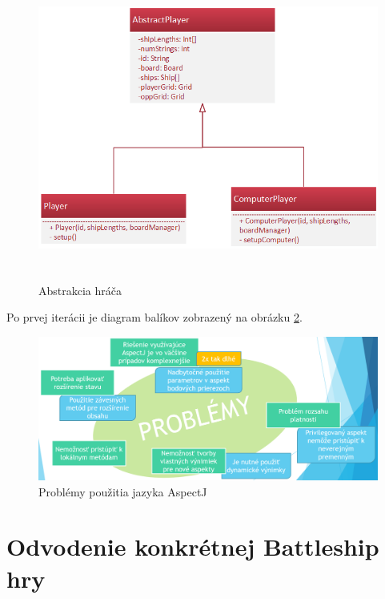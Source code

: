 \documentclass[11pt,slovak,a4paper,twoside]{article}
\begin{document}
\begin{figure}[H]  %
					\begin{center}
									\includegraphics[height=10cm]{fig/playerAbstraction.png}
									\caption{Abstrakcia hráča}
									\label{playerAbstraction}
					\end{center}
\end{figure}

Po prvej iterácii je diagram balíkov zobrazený na obrázku \ref{problemsOfAspectJ}.

\begin{figure}[H]  %
					\begin{center}
									\includegraphics[width=\linewidth]{fig/problemsOfAspectJ.png}
									\caption{Problémy použitia jazyka AspectJ}
									\label{problemsOfAspectJ}
					\end{center}
\end{figure}



\section{Odvodenie konkrétnej Battleship hry} \label{layersSection}
\end{document}
